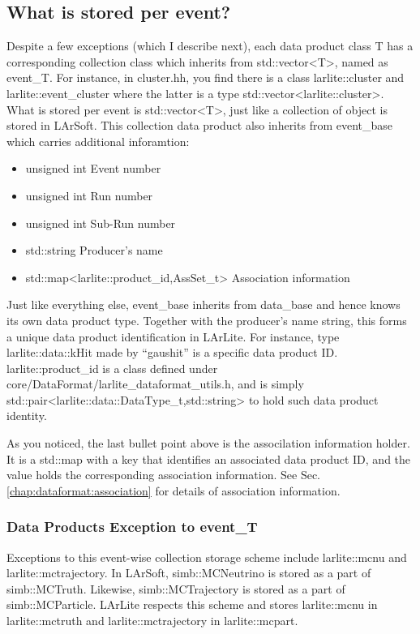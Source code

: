 \subsection{What is stored per event?}
Despite a few exceptions (which I describe next), each data product class {\ttfamily T} has a corresponding collection class which inherits from {\ttfamily std::vector<T>}, named as {\ttfamily event\_T}. 
For instance, in {\ttfamily cluster.hh}, you find there is a class {\ttfamily larlite::cluster} and {\ttfamily larlite::event\_cluster} where the latter is a type {\ttfamily std::vector<larlite::cluster>}. What is stored per event is {\ttfamily std::vector<T>}, just like a collection of object is stored in LArSoft. This collection data product also inherits from {\ttfamily event\_base} which carries additional inforamtion:
\begin{itemize}
\item {\ttfamily unsigned int} Event number
\item {\ttfamily unsigned int} Run number
\item {\ttfamily unsigned int} Sub-Run number
\item {\ttfamily std::string} Producer's name
\item {\ttfamily std::map<larlite::product\_id,AssSet\_t>} Association information
\end{itemize}
Just like everything else, {\ttfamily event\_base} inherits from {\ttfamily data\_base} and hence knows its own data product type. Together with the producer's name string, this forms a unique data product identification in LArLite. For instance, type {\ttfamily larlite::data::kHit} made by ``gaushit'' is a specific data product ID. {\ttfamily larlite::product\_id} is a class defined under {\ttfamily core/DataFormat/larlite\_dataformat\_utils.h}, and is simply {\ttfamily std::pair<larlite::data::DataType\_t,std::string>} to hold such data product identity. 

As you noticed, the last bullet point above is the associlation information holder.
It is a {\ttfamily std::map} with a key that identifies an associated data product ID, and the value holds the corresponding association information.
See Sec.\ref{chap:dataformat:association} for details of association information.

\subsubsection{Data Products Exception to {\ttfamily event\_T}}
Exceptions to this event-wise collection storage scheme include {\ttfamily larlite::mcnu} and {\ttfamily larlite::mctrajectory}.
In LArSoft, {\ttfamily simb::MCNeutrino} is stored as a part of {\ttfamily simb::MCTruth}. Likewise, {\ttfamily simb::MCTrajectory} is stored as a part of {\ttfamily simb::MCParticle}. LArLite respects this scheme and stores {\ttfamily larlite::mcnu} in {\ttfamily larlite::mctruth} and {\ttfamily larlite::mctrajectory} in {\ttfamily larlite::mcpart}.

